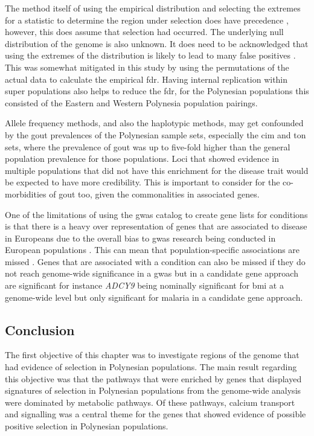 \documentclass[twoside,openright]{report}
\begin{document}
The method itself of using the empirical distribution and selecting the
extremes for a statistic to determine the region under selection does
have precedence \citep{voight2006map, Hider2013, Jonnalagadda2017},
however, this does assume that selection had occurred. The underlying
null distribution of the genome is also unknown. It does need to be
acknowledged that using the extremes of the distribution is likely to
lead to many false positives \citep{Teshima2006}. This was somewhat
mitigated in this study by using the permutations of the actual data to
calculate the empirical \gls{fdr}. Having internal replication within
super populations also helps to reduce the \gls{fdr}, for the Polynesian
populations this consisted of the Eastern and Western Polynesia
population pairings.

Allele frequency methods, and also the haplotypic methods, may get
confounded by the gout prevalences of the Polynesian sample sets,
especially the \gls{cim} and \gls{ton} sets, where the prevalence of
gout was up to five-fold higher than the general population prevalence
for those populations. Loci that showed evidence in multiple populations
that did not have this enrichment for the disease trait would be
expected to have more credibility. This is important to consider for the
co-morbidities of gout too, given the commonalities in associated genes.

One of the limitations of using the \gls{gwas} catalog to create gene
lists for conditions is that there is a heavy over representation of
genes that are associated to disease in Europeans due to the overall
bias to \gls{gwas} research being conducted in European populations
\citep{Haga2010, Popejoy2016}. This can mean that population-specific
associations are missed \citep{Weissglas-Volkov2013, Minster2016}. Genes
that are associated with a condition can also be missed if they do not
reach genome-wide significance in a \gls{gwas} but in a candidate gene
approach are significant for instance \emph{ADCY9} being nominally
significant for \gls{bmi} at a genome-wide level but only significant
for malaria in a candidate gene approach.

\subsection{Conclusion}\label{conclusion}

The first objective of this chapter was to investigate regions of the
genome that had evidence of selection in Polynesian populations. The
main result regarding this objective was that the pathways that were
enriched by genes that displayed signatures of selection in Polynesian
populations from the genome-wide analysis were dominated by metabolic
pathways. Of these pathways, calcium transport and signalling was a
central theme for the genes that showed evidence of possible positive
selection in Polynesian populations.
\end{document}
